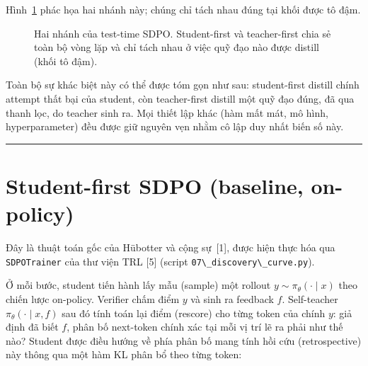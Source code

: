 Hình~\ref{fig:two-arms} phác họa hai nhánh này; chúng chỉ tách nhau đúng tại khối được tô đậm.

\begin{figure}[H]
\centering
{}
\caption{Hai nhánh của test-time SDPO. Student-first và teacher-first chia sẻ toàn bộ vòng lặp và chỉ tách nhau ở việc quỹ đạo nào được distill (khối tô đậm).}
\label{fig:two-arms}
\end{figure}

Toàn bộ sự khác biệt này có thể được tóm gọn như sau: student-first distill chính attempt thất bại của student, còn teacher-first distill một quỹ đạo đúng, đã qua thanh lọc, do teacher sinh ra. Mọi thiết lập khác (hàm mất mát, mô hình, hyperparameter) đều được giữ nguyên vẹn nhằm cô lập duy nhất biến số này.

\begin{center}\rule{0.5\linewidth}{0.5pt}\end{center}

\section{Student-first SDPO (baseline, on-policy)}\label{student-first-sdpo-baseline-on-policy}

Đây là thuật toán gốc của Hübotter và cộng sự~{[}1{]}, được hiện thực hóa qua \passthrough{\lstinline!SDPOTrainer!} của thư viện TRL {[}5{]} (script \passthrough{\lstinline!07\_discovery\_curve.py!}).

Ở mỗi bước, student tiến hành lấy mẫu (sample) một rollout \(y \sim \pi_\theta(\cdot \mid x)\) theo chiến lược on-policy. Verifier chấm điểm \(y\) và sinh ra feedback \(f\). Self-teacher \(\pi_\theta(\cdot \mid x, f)\) sau đó tính toán lại điểm (rescore) cho từng token của chính \(y\): giả định đã biết \(f\), phân bố next-token chính xác tại mỗi vị trí lẽ ra phải như thế nào? Student được điều hướng về phía phân bố mang tính hồi cứu (retrospective) này thông qua một hàm KL phân bổ theo từng token:

